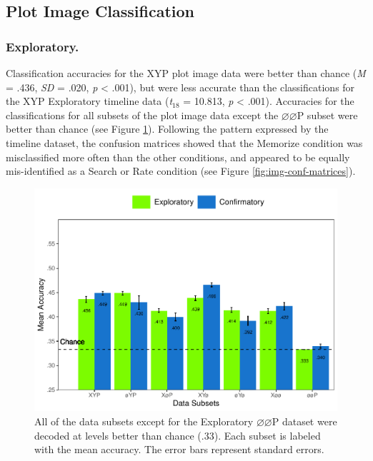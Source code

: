 \documentclass[
  english,
  man, donotrepeattitle,floatsintext]{apa6}
\begin{document}
\subsection{Plot Image Classification}
\subsubsection{Exploratory.}

Classification accuracies for the XYP plot image data were better than chance (\emph{M} = .436, \emph{SD} = .020, \emph{p} \textless{} .001), but were less accurate than the classifications for the XYP Exploratory timeline data (\emph{t}\(_{18}\) = 10.813, \emph{p} \textless{} .001). Accuracies for the classifications for all subsets of the plot image data except the \(\varnothing\varnothing\)P subset were better than chance (see Figure \ref{fig:img-parcellation-chance}). Following the pattern expressed by the timeline dataset, the confusion matrices showed that the Memorize condition was misclassified more often than the other conditions, and appeared to be equally mis-identified as a Search or Rate condition (see Figure \ref{fig:img-conf-matrices}).

\begin{figure}
\centering
\includegraphics{figures/r_code/img_subset_chance.pdf}
\caption{\label{fig:img-parcellation-chance}All of the data subsets except for the Exploratory \(\varnothing\varnothing\)P dataset were decoded at levels better than chance (.33). Each subset is labeled with the mean accuracy. The error bars represent standard errors.}
\end{figure}
\end{document}
